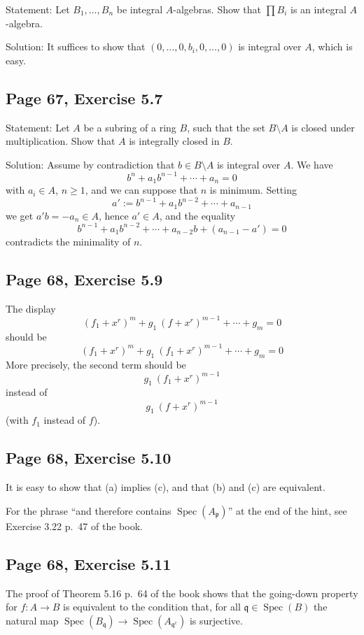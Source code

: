 \documentclass[parskip=half,fontsize=12pt]{scrartcl}%
\newcommand{\oo}{\operatorname}\newcommand{\ooo}{\operatorname*}
\newcommand{\mf}{\mathfrak}
\newcommand{\ppp}{\mf p}
\newcommand{\qqq}{\mf q}
\newcommand{\Spec}{\operatorname{Spec}}\newcommand{\Sp}{\operatorname{Spec}}
\begin{document}
Statement: Let $B_1,\ldots,B_n$ be integral $A$-algebras. Show that $\prod B_i$ is an integral $A$-algebra.

Solution: It suffices to show that $(0,\dots,0,b_i,0,\dots,0)$ is integral over $A$, which is easy. 

\subsection{Page 67, Exercise 5.7}%

Statement: Let $A$ be a subring of a ring $B$, such that the set $B\setminus A$ is closed under multiplication. Show that $A$ is integrally closed in $B$.

Solution: Assume by contradiction that $b\in B\setminus A$ is integral over $A$. We have 
$$
b^n+a_1b^{n-1}+\cdots+a_n=0
$$ 
with $a_i\in A$, $n\ge1$, and we can suppose that $n$ is minimum. Setting 
$$
a':=b^{n-1}+a_1b^{n-2}+\cdots+a_{n-1}
$$
we get $a'b=-a_n\in A$, hence $a'\in A$, and the equality 
$$
b^{n-1}+a_1b^{n-2}+\cdots+a_{n-2}b+(a_{n-1}-a')=0
$$ 
contradicts the minimality of $n$. 

\subsection{Page 68, Exercise 5.9}%

The display 
$$
(f_1+x^r)^m+g_1\ (f+x^r)^{m-1}+\cdots+g_m=0
$$ 
should be 
$$
(f_1+x^r)^m+g_1\ (f_1+x^r)^{m-1}+\cdots+g_m=0
$$ 
More precisely, the second term should be $$g_1\ (f_1+x^r)^{m-1}$$ instead of $$g_1\ (f+x^r)^{m-1}$$ (with $f_1$ instead of $f$).

\subsection{Page 68, Exercise 5.10}%

It is easy to show that (a) implies (c), and that (b) and (c) are equivalent.

For the phrase ``and therefore contains $\Spec(A_\ppp)$'' at the end of the hint, see Exercise 3.22 p.~47 of the book.

\subsection{Page 68, Exercise 5.11}%

The proof of Theorem 5.16 p.~64 of the book shows that the going-down property for $f:A\to B$ is equivalent to the condition that, for all $\qqq\in\Spec(B)$ the natural map $\Spec(B_\qqq)\to\Spec(A_{\qqq^{\oo c}})$ is surjective. 
\end{document}
